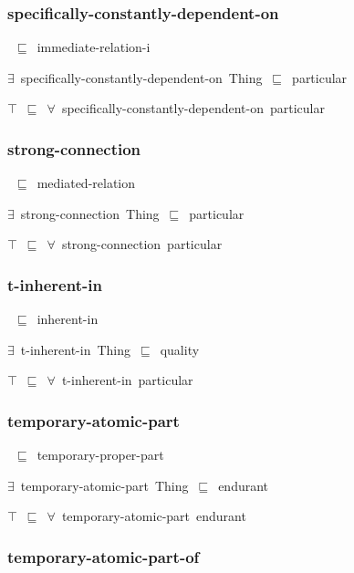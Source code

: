 \documentclass{article}
\begin{document}
\subsubsection*{specifically-constantly-dependent-on}

~\ensuremath{\sqsubseteq}~immediate-relation-i

\ensuremath{\exists}~specifically-constantly-dependent-on~Thing~\ensuremath{\sqsubseteq}~particular

\ensuremath{\top}~\ensuremath{\sqsubseteq}~\ensuremath{\forall}~specifically-constantly-dependent-on~particular

\subsubsection*{strong-connection}

~\ensuremath{\sqsubseteq}~mediated-relation

\ensuremath{\exists}~strong-connection~Thing~\ensuremath{\sqsubseteq}~particular

\ensuremath{\top}~\ensuremath{\sqsubseteq}~\ensuremath{\forall}~strong-connection~particular

\subsubsection*{t-inherent-in}

~\ensuremath{\sqsubseteq}~inherent-in

\ensuremath{\exists}~t-inherent-in~Thing~\ensuremath{\sqsubseteq}~quality

\ensuremath{\top}~\ensuremath{\sqsubseteq}~\ensuremath{\forall}~t-inherent-in~particular

\subsubsection*{temporary-atomic-part}

~\ensuremath{\sqsubseteq}~temporary-proper-part

\ensuremath{\exists}~temporary-atomic-part~Thing~\ensuremath{\sqsubseteq}~endurant

\ensuremath{\top}~\ensuremath{\sqsubseteq}~\ensuremath{\forall}~temporary-atomic-part~endurant

\subsubsection*{temporary-atomic-part-of}
\end{document}
